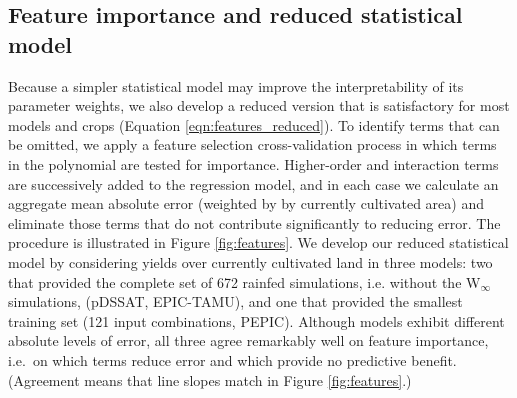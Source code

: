 \documentclass[gmd, manuscript]{copernicus} %
\begin{document}
\subsection{Feature importance and reduced statistical model}
\label{sec:features}

Because a simpler statistical model may improve the interpretability of its parameter weights, we also develop a reduced version that is satisfactory for most models and crops (Equation \ref{eqn:features_reduced}).
To identify terms that can be omitted, we apply a feature selection cross-validation process in which terms in the polynomial are tested for importance. Higher-order and interaction terms are successively added to the regression model, and in each case we calculate an aggregate mean absolute error (weighted by by currently cultivated area) and eliminate those terms that do not contribute significantly to reducing error. The procedure is illustrated in Figure \ref{fig:features}. We develop our reduced statistical model by considering yields over currently cultivated land in three models: two that provided the complete set of 672 rainfed simulations, i.e. without the W$_{\infty}$ simulations,  (pDSSAT, EPIC-TAMU), and one that provided the smallest training set (121 input combinations, PEPIC).
Although models exhibit different absolute levels of error, all three agree remarkably well on feature importance, i.e.\ on which terms reduce error and which provide no predictive benefit. (Agreement means that line slopes match in Figure \ref{fig:features}.) 
 
\end{document}
